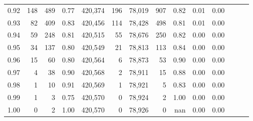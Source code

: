 \begin{tabular}{rrrrrrrrrrrrrr}
0.92 &    148 &    489 &  0.77 &  420,374 &      196 &  78,019 &     907 &  0.82 &  0.01 &      0.00 \\
0.93 &     82 &    409 &  0.83 &  420,456 &      114 &  78,428 &     498 &  0.81 &  0.01 &      0.00 \\
0.94 &     59 &    248 &  0.81 &  420,515 &       55 &  78,676 &     250 &  0.82 &  0.00 &      0.00 \\
0.95 &     34 &    137 &  0.80 &  420,549 &       21 &  78,813 &     113 &  0.84 &  0.00 &      0.00 \\
0.96 &     15 &     60 &  0.80 &  420,564 &        6 &  78,873 &      53 &  0.90 &  0.00 &      0.00 \\
0.97 &      4 &     38 &  0.90 &  420,568 &        2 &  78,911 &      15 &  0.88 &  0.00 &      0.00 \\
0.98 &      1 &     10 &  0.91 &  420,569 &        1 &  78,921 &       5 &  0.83 &  0.00 &      0.00 \\
0.99 &      1 &      3 &  0.75 &  420,570 &        0 &  78,924 &       2 &  1.00 &  0.00 &      0.00 \\
1.00 &      0 &      2 &  1.00 &  420,570 &        0 &  78,926 &       0 &   nan &  0.00 &      0.00 \\
\bottomrule
\end{tabular}
